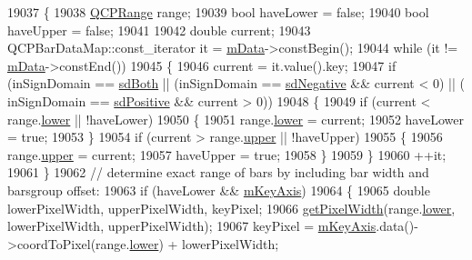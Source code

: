 \begin{DoxyCode}
19037 \{
19038   \hyperlink{class_q_c_p_range}{QCPRange} range;
19039   \textcolor{keywordtype}{bool} haveLower = \textcolor{keyword}{false};
19040   \textcolor{keywordtype}{bool} haveUpper = \textcolor{keyword}{false};
19041   
19042   \textcolor{keywordtype}{double} current;
19043   QCPBarDataMap::const\_iterator it = \hyperlink{class_q_c_p_bars_aef28d29d51ef84b608ecd22c55d531ff}{mData}->constBegin();
19044   \textcolor{keywordflow}{while} (it != \hyperlink{class_q_c_p_bars_aef28d29d51ef84b608ecd22c55d531ff}{mData}->constEnd())
19045   \{
19046     current = it.value().key;
19047     \textcolor{keywordflow}{if} (inSignDomain == \hyperlink{class_q_c_p_abstract_plottable_a661743478a1d3c09d28ec2711d7653d8a082b98cfb91a7363a3b5cd17b0c1cd60}{sdBoth} || (inSignDomain == \hyperlink{class_q_c_p_abstract_plottable_a661743478a1d3c09d28ec2711d7653d8a0fc9a70796ef60ad18ddd18056e6dc63}{sdNegative} && current < 0) || (
      inSignDomain == \hyperlink{class_q_c_p_abstract_plottable_a661743478a1d3c09d28ec2711d7653d8a02951859f243a4d24e779cfbb5471030}{sdPositive} && current > 0))
19048     \{
19049       \textcolor{keywordflow}{if} (current < range.\hyperlink{class_q_c_p_range_aa3aca3edb14f7ca0c85d912647b91745}{lower} || !haveLower)
19050       \{
19051         range.\hyperlink{class_q_c_p_range_aa3aca3edb14f7ca0c85d912647b91745}{lower} = current;
19052         haveLower = \textcolor{keyword}{true};
19053       \}
19054       \textcolor{keywordflow}{if} (current > range.\hyperlink{class_q_c_p_range_ae44eb3aafe1d0e2ed34b499b6d2e074f}{upper} || !haveUpper)
19055       \{
19056         range.\hyperlink{class_q_c_p_range_ae44eb3aafe1d0e2ed34b499b6d2e074f}{upper} = current;
19057         haveUpper = \textcolor{keyword}{true};
19058       \}
19059     \}
19060     ++it;
19061   \}
19062   \textcolor{comment}{// determine exact range of bars by including bar width and barsgroup offset:}
19063   \textcolor{keywordflow}{if} (haveLower && \hyperlink{class_q_c_p_abstract_plottable_a426f42e254d0f8ce5436a868c61a6827}{mKeyAxis})
19064   \{
19065     \textcolor{keywordtype}{double} lowerPixelWidth, upperPixelWidth, keyPixel;
19066     \hyperlink{class_q_c_p_bars_a794eefe4fb29b9b40583654ccbf460dc}{getPixelWidth}(range.\hyperlink{class_q_c_p_range_aa3aca3edb14f7ca0c85d912647b91745}{lower}, lowerPixelWidth, upperPixelWidth);
19067     keyPixel = \hyperlink{class_q_c_p_abstract_plottable_a426f42e254d0f8ce5436a868c61a6827}{mKeyAxis}.data()->coordToPixel(range.\hyperlink{class_q_c_p_range_aa3aca3edb14f7ca0c85d912647b91745}{lower}) + lowerPixelWidth;

\end{DoxyCode}
